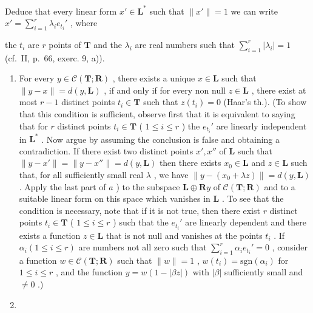 Deduce that every linear form \(x' \in \mathbf{L}^*\) such that \(\| x' \| = 1\) we can write \(x' = \sum_{i=1}^{r} \lambda_i e_{t_i}'\) , where

the \(t_i\) are \(r\) points of \(\mathbf{T}\) and the \(\lambda_i\) are real numbers such that \(\sum_{i=1}^{r} |\lambda_i| = 1\) (cf.~II, p.~66, exerc. 9, a)).

\begin{enumerate}
\def\labelenumi{\alph{enumi})}
\setcounter{enumi}{1}
\tightlist
\item
  For every \(y \in \mathcal{C}(\mathbf{T}; \mathbf{R})\) , there exists a unique \(x \in \mathbf{L}\) such that \(\| y - x \| = d(y, \mathbf{L})\) , if and only if for every non null \(z \in \mathbf{L}\) , there exist at most \(r - 1\) distinct points \(t_i \in \mathbf{T}\) such that \(z(t_i) = 0\) (Haar's th.). (To show that this condition is sufficient, observe first that it is equivalent to saying that for \(r\) distinct points \(t_i \in \mathbf{T}\) ( \(1 \leqslant i \leqslant r\) ) the \(e_{t_i}'\) are linearly independent in \(\mathbf{L}^*\) . Now argue by assuming the conclusion is false and obtaining a contradiction. If there exist two distinct points \(x', x''\) of \(\mathbf{L}\) such that \(\| y - x' \| = \| y - x'' \| = d(y, \mathbf{L})\) then there exists \(x_0 \in \mathbf{L}\) and \(z \in \mathbf{L}\) such that, for all sufficiently small real \(\lambda\) , we have \(\| y - (x_0 + \lambda z) \| = d(y, \mathbf{L})\) . Apply the last part of \(a\) ) to the subspace \(\mathbf{L} \oplus \mathbf{R}y\) of \(\mathcal{C}(\mathbf{T}; \mathbf{R})\) and to a suitable linear form on this space which vanishes in \(\mathbf{L}\) . To see that the condition is necessary, note that if it is not true, then there exist \(r\) distinct points \(t_i \in \mathbf{T}\) ( \(1 \leqslant i \leqslant r\) ) such that the \(e_{t_i}'\) are linearly dependent and there exists a function \(z \in \mathbf{L}\) that is not null and vanishes at the points \(t_i\) . If \(\alpha_i (1 \leqslant i \leqslant r)\) are numbers not all zero such that \(\sum_{i=1}^{r} \alpha_i e_{t_i}' = 0\) , consider a function \(w \in \mathcal{C}(\mathbf{T}; \mathbf{R})\) such that \(\| w \| = 1\) , \(w(t_i) = \text{sgn}(\alpha_i)\) for \(1 \leqslant i \leqslant r\) , and the function \(y = w(1 - |\beta z|)\) with \(|\beta|\) sufficiently small and \(\neq 0\) .)
\item

\end{enumerate}
